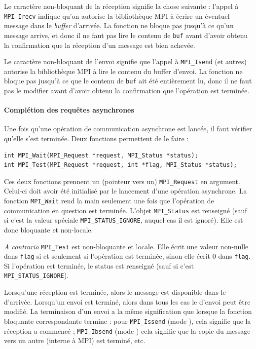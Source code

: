 Le caractère non-bloquant de la réception signifie la chose suivante : l'appel à
\verb|MPI_Irecv| indique qu'on autorise la bibliothèque MPI à écrire un éventuel
message dans le \emph{buffer} d'arrivée. La fonction ne bloque pas jusqu'à ce
qu'un message arrive, et donc il ne faut pas lire le contenu de \verb|buf| avant
d'avoir obtenu la confirmation que la réception d'un message est bien achevée.

Le caractère non-bloquant de l'envoi signifie que l'appel à \verb|MPI_Isend| (et
autres) autorise la bibliothèque MPI à lire le contenu du buffer d'envoi. La
fonction ne bloque pas jusqu'à ce que le contenu de \verb|buf| ait été
entièrement lu, donc il ne faut pas le modifier avant d'avoir obtenu la
confirmation que l'opération est terminée.

\paragraph{Complétion des requêtes asynchrones} Une fois qu'une opération de
communication asynchrone est lancée, il faut vérifier qu'elle s'est
terminée. Deux fonctions permettent de le faire :
\begin{verbatim}
int MPI_Wait(MPI_Request *request, MPI_Status *status);
int MPI_Test(MPI_Request *request, int *flag, MPI_Status *status);
\end{verbatim}

Ces deux fonctions prennent un (pointeur vers un) \verb|MPI_Request| en
argument. Celui-ci doit avoir été initialisé par le lancement d'une opération
asynchrone. La fonction \verb|MPI_Wait| rend la main seulement une fois que
l'opération de communication en question est terminée. L'objet \verb|MPI_Status|
est renseigné (sauf si c'est la valeur spéciale \verb|MPI_STATUS_IGNORE|, auquel
cas il est ignoré). Elle est donc bloquante et \og non-locale\fg.

\textit{A contrario} \verb|MPI_Test| est non-bloquante et locale. Elle écrit une
valeur non-nulle dans \verb|flag| si et seulement si l'opération est terminée,
sinon elle écrit 0 dans \verb|flag|. Si l'opération est terminée, le status est
renseigné (sauf si c'est \verb|MPI_STATUS_IGNORE|).

Lorsqu'une réception est terminée, alors le message est disponible dans le
 d'arrivée. Lorsqu'un envoi est terminé, alors dans tous les cas
le  d'envoi peut être modifié. La terminaison d'un envoi a la
même signification que lorsque la fonction bloquante correspondante termine :
pour \verb|MPI_Issend| (mode ), cela signifie que la
réception a commencé ; \verb|MPI_Ibsend| (mode ) cela signifie
que la copie du message vers un autre  (interne à MPI) est terminé, etc.

